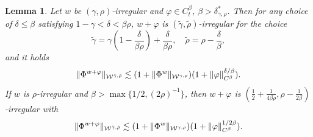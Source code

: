 \documentclass[10pt]{article}
\newcommand{\comma}{{,}}
\newcommand{\tmcolor}[2]{{\color{#1}{#2}}}
\newtheorem{lemma}[theorem]{Lemma}
\begin{document}
\begin{lemma}
  \label{sec5.3 lemma additive perturbation}Let $w$ be $(\gamma,
  \rho)$\mbox{-}irregular and $\varphi \in C_t^{\beta}$, $\beta >
  \delta^{\ast}_{\gamma, \rho}$. Then for any choice of $\delta \leqslant
  \beta$ satisfying $1 - \gamma < \delta < \beta \rho$, $w + \varphi$ is
  $(\tilde{\gamma}, \tilde{\rho})$\mbox{-}irregular for the choice
  \[ \tilde{\gamma} = \gamma \left( 1 - \frac{\delta}{\beta \rho} \right) +
     \frac{\delta}{\beta \rho}, \quad \tilde{\rho} = \rho -
     \frac{\delta}{\beta}, \label{sec5.3 parameters additive perturbation} \]
  and it holds
  \[ \tmcolor{black}{\| \Phi^{w + \varphi} \|_{\mathcal{W}^{\tilde{\gamma}
     \comma \tilde{\rho}}} \lesssim (1 + \| \Phi^w \|_{\mathcal{W}^{\gamma
     \comma \rho}}) (1 + \| \varphi \|^{\delta / \beta}_{C^{\beta}}) .} \]
  If $w$ is $\rho$-irregular and $\beta > \max \{ 1 / 2, (2 \rho)^{- 1} \}$,
  then $w + \varphi$ is $\left( \frac{1}{2} + \frac{1}{4 \beta \rho}, \rho -
  \frac{1}{2 \beta} \right)$\mbox{-}irregular with
  \[ \tmcolor{black}{\| \Phi^{w + \varphi} \|_{\mathcal{W}^{\tilde{\gamma}
     \comma \tilde{\rho}}} \lesssim (1 + \| \Phi^w \|_{\mathcal{W}^{\gamma
     \comma \rho}}) (1 + \| \varphi \|^{1 / 2 \beta}_{C^{\beta}}) .} \]
\end{lemma}
\end{document}
